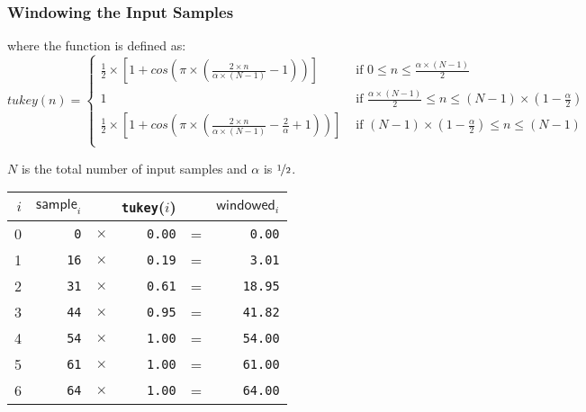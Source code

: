 \subsubsection{Windowing the Input Samples}
\label{alac:window}
{
\Return \WINDOWED\;
\EALGORITHM
\par
\noindent
where the  function is defined as:
\begin{equation*}
tukey(n) =
\begin{cases}
\frac{1}{2} \times \left[1 + cos\left(\pi \times \left(\frac{2 \times n}{\alpha \times (N - 1)} - 1 \right)\right)\right] & \text{ if } 0 \leq n \leq \frac{\alpha \times (N - 1)}{2} \\
1 & \text{ if } \frac{\alpha \times (N - 1)}{2} \leq n \leq (N - 1) \times (1 - \frac{\alpha}{2}) \\
\frac{1}{2} \times \left[1 + cos\left(\pi \times \left(\frac{2 \times n}{\alpha \times (N - 1)} - \frac{2}{\alpha} + 1 \right)\right)\right] & \text{ if } (N - 1) \times (1 - \frac{\alpha}{2}) \leq n \leq (N - 1) \\
\end{cases}
\end{equation*}
\par
\noindent
$N$ is the total number of input samples and $\alpha$ is $\nicefrac{1}{2}$.
\par
\noindent
{
\begin{tabular}{r|rcrcr}
$i$ & $\textsf{sample}_i$ & & \texttt{tukey}($i$) & & $\textsf{windowed}_i$ \\
\hline
0 & \texttt{0} & $\times$ & \texttt{0.00} & = & \texttt{0.00} \\
1 & \texttt{16} & $\times$ & \texttt{0.19} & = & \texttt{3.01} \\
2 & \texttt{31} & $\times$ & \texttt{0.61} & = & \texttt{18.95} \\
3 & \texttt{44} & $\times$ & \texttt{0.95} & = & \texttt{41.82} \\
4 & \texttt{54} & $\times$ & \texttt{1.00} & = & \texttt{54.00} \\
5 & \texttt{61} & $\times$ & \texttt{1.00} & = & \texttt{61.00} \\
6 & \texttt{64} & $\times$ & \texttt{1.00} & = & \texttt{64.00} \\

\end{tabular}}}
